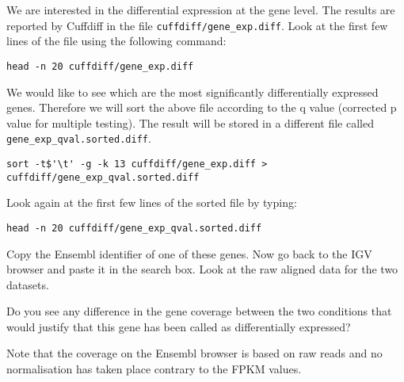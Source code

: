 \begin{steps}
We are interested in the differential expression at the gene level. The results
are reported by Cuffdiff in the file \texttt{cuffdiff/gene\_exp.diff}. 
Look at the first few lines of the file using the following command:
\begin{lstlisting}
head -n 20 cuffdiff/gene_exp.diff
\end{lstlisting}

We would like to see which are the most significantly differentially expressed
genes. Therefore we will sort the above file according to the q value
(corrected p value for multiple testing). The result will be stored in a
different file called \texttt{gene\_exp\_qval.sorted.diff}.
\begin{lstlisting}
sort -t$'\t' -g -k 13 cuffdiff/gene_exp.diff > cuffdiff/gene_exp_qval.sorted.diff
\end{lstlisting}

Look again at the first few lines of the sorted file by typing:
\begin{lstlisting}
head -n 20 cuffdiff/gene_exp_qval.sorted.diff
\end{lstlisting}

Copy the Ensembl identifier of one of these genes. Now go back to the IGV
browser and paste it in the search box. Look at the raw aligned data for the
two datasets.
\end{steps}

\begin{questions}
Do you see any difference in the gene coverage between the two conditions that
would justify that this gene has been called as differentially expressed?
\begin{answer}
\end{answer}

\end{questions}

\begin{warning}
Note that the coverage on the Ensembl browser is based on raw reads and no
normalisation has taken place contrary to the FPKM values.
\end{warning}

